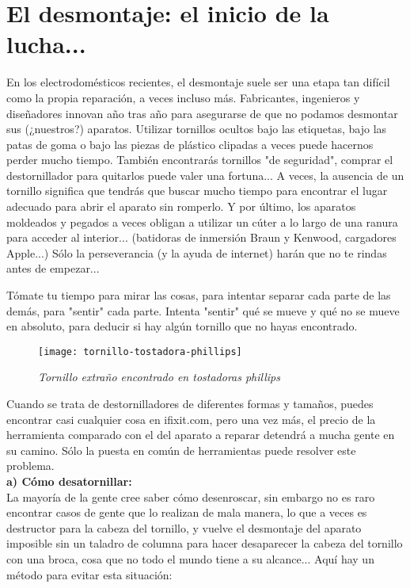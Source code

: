 \section{El desmontaje: el inicio de la lucha...}
En los electrodomésticos recientes, el desmontaje suele ser una etapa tan difícil como la propia reparación, a veces incluso más. Fabricantes, ingenieros y diseñadores innovan año tras año para asegurarse de que no podamos desmontar sus (¿nuestros?) aparatos.
Utilizar tornillos ocultos bajo las etiquetas, bajo las patas de goma o bajo las piezas de plástico clipadas a veces puede hacernos perder mucho tiempo. También encontrarás tornillos "de seguridad", comprar el destornillador para quitarlos puede valer una fortuna...
A veces, la ausencia de un tornillo significa que tendrás que buscar mucho tiempo para encontrar el lugar adecuado para abrir el aparato sin romperlo.
Y por último, los aparatos moldeados y pegados a veces obligan a utilizar un cúter a lo largo de una ranura para acceder al interior... (batidoras de inmersión Braun y Kenwood, cargadores Apple...) Sólo la perseverancia (y la ayuda de internet) harán que no te rindas antes de empezar...

Tómate tu tiempo para mirar las cosas, para intentar separar cada parte de las demás, para "sentir" cada parte. Intenta "sentir" qué se mueve y qué no se mueve en absoluto, para deducir si hay algún tornillo que no hayas encontrado.

\begin{figure}[h]
\texttt{[image: tornillo-tostadora-phillips]} 
\centering
\caption*{\textit{Tornillo extraño encontrado en tostadoras phillips}}
\end{figure}

Cuando se trata de destornilladores de diferentes formas y tamaños, puedes encontrar casi cualquier cosa en ifixit.com, pero una vez más, el precio de la herramienta comparado con el del aparato a reparar detendrá a mucha gente en su camino. Sólo la puesta en común de herramientas puede resolver este problema.\\

{\large \textbf{a) Cómo desatornillar:}}\\

La mayoría de la gente cree saber cómo desenroscar, sin embargo no es raro encontrar casos de gente que lo realizan de mala manera, lo que a veces es destructor para la cabeza del tornillo, y vuelve el desmontaje del aparato imposible sin un taladro de columna para hacer desaparecer la cabeza del tornillo con una broca, cosa que no todo el mundo tiene a su alcance...
Aquí hay un método para evitar esta situación:


